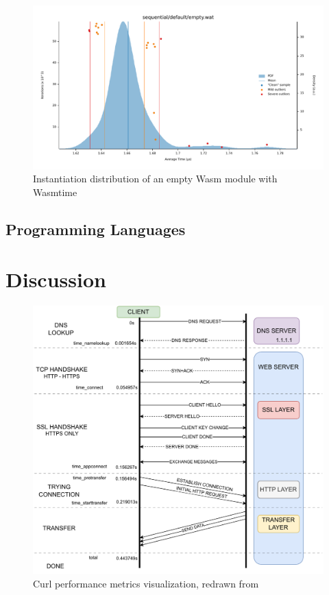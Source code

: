 \begin{figure}[htbp]
    \centering
        \includegraphics[width=1\linewidth]{images/benches/sequential_default_empty_wasm.pdf}
    \caption{Instantiation distribution of an empty Wasm module with Wasmtime}
    \label{fig:bench:instantiation:empty-wasm}
\end{figure}

\subsection{Programming Languages}
\label{subsec:programming-languages}

\section{Discussion}
\label{sec:discussion}

\begin{figure}[htbp]
    \centering
        \includegraphics[width=1\linewidth]{images/evaluation/curl_performance_metrics.drawio.pdf}
    \caption{Curl performance metrics visualization, redrawn from \cite{speedtestdemon_2021_cheat}}
    \label{fig:eval:curl-metrics}
\end{figure}